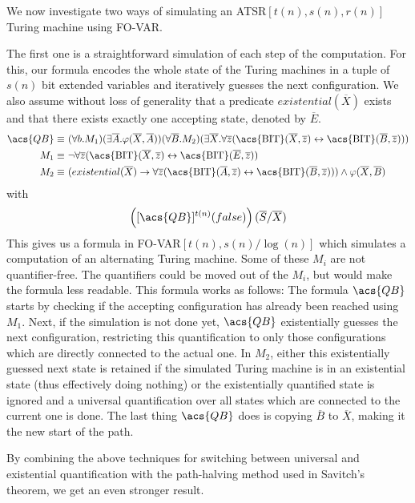 We now investigate two ways of simulating an \acs{ATSR}$[t(n), s(n), r(n)]$ Turing machine using \acs{FO-VAR}\@.

The first one is a straightforward simulation of each step of the computation.
For this, our formula encodes the whole state of the Turing machines in a tuple of $s(n)$ bit extended variables and iteratively guesses the next configuration.
We also assume without loss of generality that a predicate $existential(\overline{X})$ exists and that there exists exactly one accepting state, denoted by $\overline{E}$.
\[
    \begin{aligned}
        \acs{QB} \equiv~&(\forall b.M_{1})(\exists\overline{A}.\varphi(\overline{X}, \overline{A}))(\forall \overline{B}.M_{2})(\exists \overline{X}. \forall \overline{z}(\text{\acs{BIT}}(\overline{X}, \overline{z}) \leftrightarrow \text{\acs{BIT}}(\overline{B}, \overline{z}))) \\
        M_{1} \equiv~&\neg\forall \overline{z}(\text{\acs{BIT}}(\overline{X}, \overline{z}) \leftrightarrow \text{\acs{BIT}}(\overline{E}, \overline{z})) \\
        M_{2} \equiv~& (existential(\overline{X}) \to \forall \overline{z}(\text{\acs{BIT}}(\overline{A}, \overline{z}) \leftrightarrow \text{\acs{BIT}}(\overline{B}, \overline{z}))) \land \varphi(\overline{X}, \overline{B})
    \end{aligned}
\]
with \[
         \left([\acs{QB}]^{t(n)}(false)\right)(\overline{S} / \overline{X})
\]
This gives us a formula in \acs{FO-VAR}$[t(n), s(n)/\log(n)]$ which simulates a computation of an alternating Turing machine.
Some of these $M_i$ are not quantifier-free.
The quantifiers could be moved out of the $M_i$, but would make the formula less readable.
This formula works as follows:
The formula $\acs{QB}$ starts by checking if the accepting configuration has already been reached using $M_1$.
Next, if the simulation is not done yet, $\acs{QB}$ existentially guesses the next configuration, restricting this quantification to only those configurations which are directly connected to the actual one.
In $M_2$, either this existentially guessed next state is retained if the simulated Turing machine is in an existential state (thus effectively doing nothing) or the existentially quantified state is ignored and a universal quantification over all states which are connected to the current one is done.
The last thing $\acs{QB}$ does is copying $\overline{B}$ to $\overline{X}$, making it the new start of the path.

By combining the above techniques for switching between universal and existential quantification with the path-halving method used in Savitch's theorem, we get an even stronger result.

